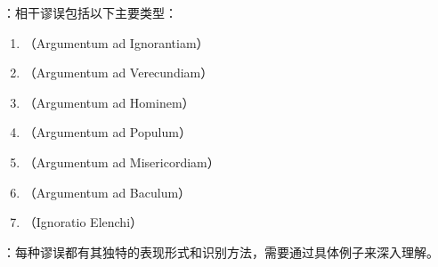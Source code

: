\begin{theorembox}[title=相干谬误的主要类型]
：相干谬误包括以下主要类型：

\begin{enumerate}
  \item {}（Argumentum ad Ignorantiam）
  \item {}（Argumentum ad Verecundiam）
  \item {}（Argumentum ad Hominem）
  \item {}（Argumentum ad Populum）
  \item {}（Argumentum ad Misericordiam）
  \item {}（Argumentum ad Baculum）
  \item {}（Ignoratio Elenchi）
\end{enumerate}

：每种谬误都有其独特的表现形式和识别方法，需要通过具体例子来深入理解。
\end{theorembox}